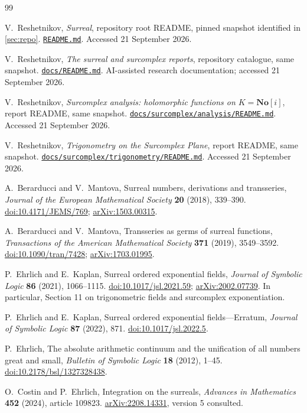\documentclass[11pt,a4paper]{article}
\numberwithin{equation}{section}
\theoremstyle{definition}
\theoremstyle{remark}
\newcommand{\No}{\mathbf{No}}
\newcommand{\arxiv}[1]{\href{https://arxiv.org/abs/#1}{arXiv:#1}}
\newcommand{\doi}[1]{\href{https://doi.org/#1}{doi:#1}}
\newcommand{\repo}[1]{\href{https://github.com/VladimirReshetnikov/Surreal/blob/39f2be6667ade51bca2b45daa47e289d69c09764/#1}{\nolinkurl{#1}}}
\begin{document}
\clearpage
\begin{thebibliography}{99}
\raggedright
{}

V.~Reshetnikov, \emph{Surreal}, repository root README, pinned snapshot
identified in \cref{sec:repo}.
\repo{README.md}. Accessed 21 September 2026.

V.~Reshetnikov, \emph{The surreal and surcomplex reports}, repository catalogue,
same snapshot. \repo{docs/README.md}. AI-assisted research documentation;
accessed 21 September 2026.

V.~Reshetnikov, \emph{Surcomplex analysis: holomorphic functions on
$K=\No[i]$}, report README, same snapshot.
\repo{docs/surcomplex/analysis/README.md}. Accessed 21 September 2026.

V.~Reshetnikov, \emph{Trigonometry on the Surcomplex Plane}, report README,
same snapshot. \repo{docs/surcomplex/trigonometry/README.md}.
Accessed 21 September 2026.

A.~Berarducci and V.~Mantova, Surreal numbers, derivations and transseries,
\emph{Journal of the European Mathematical Society} \textbf{20} (2018),
339--390. \doi{10.4171/JEMS/769}; \arxiv{1503.00315}.

A.~Berarducci and V.~Mantova, Transseries as germs of surreal functions,
\emph{Transactions of the American Mathematical Society} \textbf{371} (2019),
3549--3592. \doi{10.1090/tran/7428}; \arxiv{1703.01995}.

P.~Ehrlich and E.~Kaplan, Surreal ordered exponential fields,
\emph{Journal of Symbolic Logic} \textbf{86} (2021), 1066--1115.
\doi{10.1017/jsl.2021.59}; \arxiv{2002.07739}.
In particular, Section 11 on trigonometric fields and surcomplex exponentiation.

P.~Ehrlich and E.~Kaplan, Surreal ordered exponential fields---Erratum,
\emph{Journal of Symbolic Logic} \textbf{87} (2022), 871.
\doi{10.1017/jsl.2022.5}.

P.~Ehrlich, The absolute arithmetic continuum and the unification of all
numbers great and small, \emph{Bulletin of Symbolic Logic} \textbf{18} (2012),
1--45. \doi{10.2178/bsl/1327328438}.

O.~Costin and P.~Ehrlich, Integration on the surreals,
\emph{Advances in Mathematics} \textbf{452} (2024), article 109823.
\arxiv{2208.14331}, version 5 consulted.


\end{thebibliography}
\end{document}
